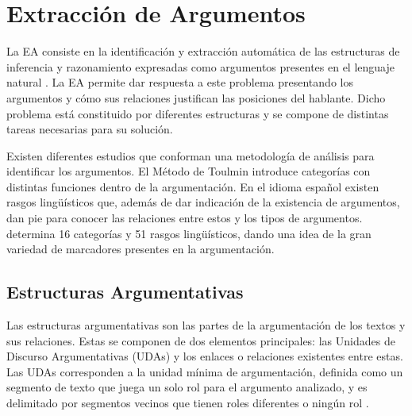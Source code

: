 \documentclass[a4paper,11pt,twocolumn,twoside]{article}
\begin{document}


\section{Extracción de Argumentos} %

La EA consiste en la identificación y extracción 
automática de las estructuras de inferencia y 
razonamiento expresadas como argumentos presentes en el lenguaje natural \cite{lawrence2020argument}.
La EA permite dar respuesta a este problema presentando
los argumentos y cómo sus relaciones justifican las posiciones del hablante. Dicho problema está constituido por diferentes 
estructuras y se compone de distintas tareas necesarias para su solución.

Existen diferentes estudios que conforman una metodología de análisis para
identificar los argumentos. El Método de Toulmin \cite{toulmin_2003} introduce categorías 
con distintas funciones dentro de la argumentación. En 
el idioma español existen rasgos lingüísticos que, además de dar indicación de la existencia de argumentos, 
dan pie para conocer las relaciones entre estos y los tipos de argumentos. 
determina 16 categorías y 51 rasgos lingüísticos, dando una idea de la gran variedad de marcadores 
presentes en la argumentación.

\subsection{Estructuras Argumentativas}

Las estructuras argumentativas son las partes de la argumentación de los textos y sus relaciones.
Estas se componen de dos elementos principales: las Unidades de Discurso Argumentativas (UDAs) y los enlaces
o relaciones existentes entre estas. Las UDAs corresponden a la unidad mínima de argumentación, definida 
como un segmento de texto que juega un solo rol para el argumento analizado, y es 
delimitado por segmentos vecinos que tienen roles diferentes o ningún rol \cite{stede2018argumentation}.
\end{document}
